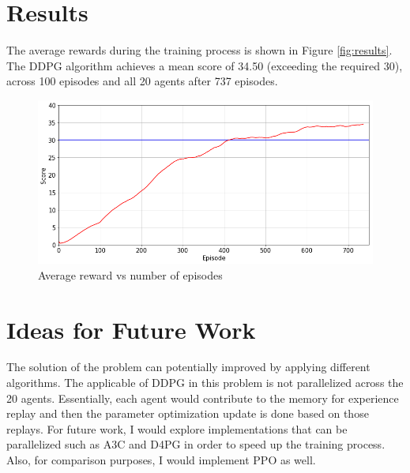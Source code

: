 \documentclass[12pt,twoside]{article}
\begin{document}
\section{Results}
	
The average rewards during the training process is shown in Figure \ref{fig:results}. The DDPG algorithm achieves a mean score of 34.50 (exceeding the required 30), across 100 episodes and all 20 agents after 737 episodes. 
	
\begin{figure}[H]
	\begin{center}
		\includegraphics[width = 0.8\hsize]{./figures/results.png} 
		\caption{Average reward vs number of episodes} %
		\label{fig:rewards} %
	\end{center}
\end{figure}


\section{Ideas for Future Work}
The solution of the problem can potentially improved by applying different algorithms. The applicable of DDPG in this problem is not parallelized across the 20 agents. Essentially, each agent would contribute to the memory for experience replay and then the parameter optimization update is done based on those replays. For future work, I would explore implementations that can be parallelized such as A3C and D4PG in order to speed up the training process. Also, for comparison purposes, I would implement PPO as well.




\end{document}
